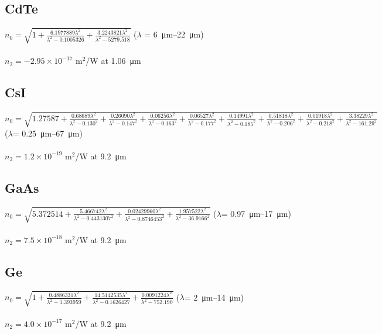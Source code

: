 \subsection*{CdTe}
$n_0=\sqrt{1+\frac{6.1977889\lambda^2}{\lambda^2-0.1005326}+\frac{3.2243821\lambda^2}{\lambda^2-5279.518}}$ (\(\lambda\) = \SIrange{6}{22}{\micro\meter}) \cite{DeBell-1979}\\
\\
$n_2 = -2.95\times 10^{-17}$ m$^2$/W at \SI{1.06}{\micro\meter} \cite{Sheik-Bahae-1991}

\subsection*{CsI}
$n_0=\sqrt{1.27587+\frac{0.68689\lambda^2}{\lambda^2-0.130^2}+\frac{0.26090\lambda^2}{\lambda^2-0.147^2}+\frac{0.06256\lambda^2}{\lambda^2-0.163^2}+\frac{0.06527\lambda^2}{\lambda^2-0.177^2}+\frac{0.14991\lambda^2}{\lambda^2-0.185^2}+\frac{0.51818\lambda^2}{\lambda^2-0.206^2}+\frac{0.01918\lambda^2}{\lambda^2-0.218^2}+\frac{3.38229\lambda^2}{\lambda^2-161.29^2}}$ (\(\lambda\)= \SIrange{0.25}{67}{\micro\meter}) \cite{Li-1976}\\
\\
$n_2 = 1.2\times 10^{-19}$ m$^2$/W at \SI{9.2}{\micro\meter} \cite{Polyanskiy-2023}

\subsection*{GaAs}
$n_0=\sqrt{5.372514+\frac{5.466742\lambda^2}{\lambda^2-0.4431307^2}+\frac{0.02429960\lambda^2}{\lambda^2-0.8746453^2}+\frac{1.957522\lambda^2}{\lambda^2-36.9166^2}}$ (\(\lambda\)= \SIrange{0.97}{17}{\micro\meter}) \cite{Skauli-2003}\\
\\
$n_2 = 7.5\times 10^{-18}$ m$^2$/W at \SI{9.2}{\micro\meter} \cite{Polyanskiy-2023}

\subsection*{Ge}
$n_0=\sqrt{1+\frac{0.4886331\lambda^2}{\lambda^2-1.393959}+\frac{14.5142535\lambda^2}{\lambda^2-0.1626427}+\frac{0.0091224\lambda^2}{\lambda^2-752.190}}$ (\(\lambda\)= \SIrange{2}{14}{\micro\meter}) \cite{Burnett-2016}\\
\\
$n_2 = 4.0\times 10^{-17}$ m$^2$/W at \SI{9.2}{\micro\meter} \cite{Polyanskiy-2023}

